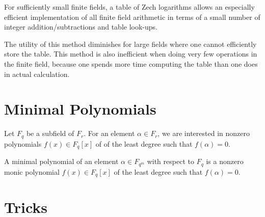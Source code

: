 For sufficiently small finite fields,
 a table of Zech logarithms allows an especially efficient 
 implementation of all finite field arithmetic in terms of a small 
 number of integer addition/subtractions and table look-ups.

The utility of this method diminishes for large fields 
where one cannot efficiently store the table. 
This method is also inefficient when doing very few 
operations in the finite field, because one spends more time 
computing the table than one does in actual calculation.


\section{Minimal Polynomials}

Let $F_q$ be a subfield of $F_r$. For an element $\alpha\in F_r$,
we are interested in nonzero
polynomials $f(x)\in F_q[x]$ of of the least degree such that $f(\alpha)=0$.
\begin{definition}
    A minimal polynomial of an element $\alpha\in F_{q^m}$ 
    with respect to $F_q$ is a nonzero monic polynomial 
    $f(x)\in F_q[x]$ of the least degree such that $f(\alpha)=0$.
\end{definition}


\section{Tricks}
